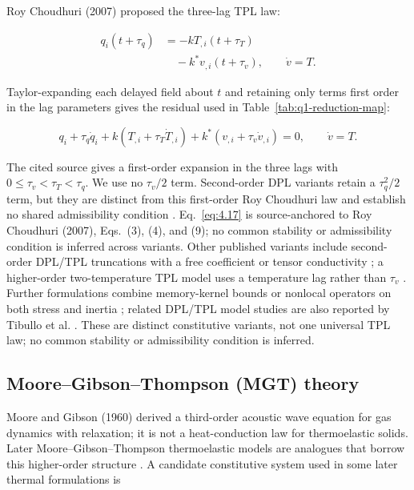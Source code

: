 Roy Choudhuri (2007) \cite{RoyChoudhuri2007} proposed the three-lag TPL law:

\begin{equation}
\begin{aligned}
q_i(t+\tau_q) &= -kT_{,i}(t+\tau_T)\\
&\quad - k^*v_{,i}(t+\tau_v), \qquad \dot v=T.
\end{aligned}
\label{eq:4.17}
\end{equation}

Taylor-expanding each delayed field about $t$ and retaining only terms first order in the lag parameters gives the residual used in Table~\ref{tab:q1-reduction-map}:

\begin{equation*}
q_i+\tau_q\dot q_i+k\left(T_{,i}+\tau_T\dot T_{,i}\right)
+k^*\left(v_{,i}+\tau_v\dot v_{,i}\right)=0,
\qquad \dot v=T.
\end{equation*}

The cited source gives a first-order expansion in the three lags with $0\leq\tau_v<\tau_T<\tau_q$. We use no $\tau_v/2$ term. Second-order DPL variants retain a $\tau_q^2/2$ term, but they are distinct from this first-order Roy Choudhuri law and establish no shared admissibility condition \cite{Yang2021,Gupta2023}. Eq.~\eqref{eq:4.17} is source-anchored to Roy Choudhuri (2007), Eqs.~(3), (4), and (9); no common stability or admissibility condition is inferred across variants. Other published variants include second-order DPL/TPL truncations with a free coefficient or tensor conductivity \cite{Kumar2023,Singh2019,Biswas2019}; a higher-order two-temperature TPL model uses a temperature lag rather than $\tau_v$ \cite{Abouelregal2020}. Further formulations combine memory-kernel bounds \cite{Singh2020a} or nonlocal operators on both stress and inertia \cite{Bayones2021}; related DPL/TPL model studies are also reported by Tibullo et al. \cite{Tibullo2017}. These are distinct constitutive variants, not one universal TPL law; no common stability or admissibility condition is inferred.

\subsection{Moore--Gibson--Thompson (MGT) theory}
\label{sec:4.9}

Moore and Gibson (1960) derived a third-order acoustic wave equation for gas dynamics with relaxation; it is not a heat-conduction law for thermoelastic solids. Later Moore--Gibson--Thompson thermoelastic models are analogues that borrow this higher-order structure \cite{MooreGibson1960,Quintanilla2019}. A candidate constitutive system used in some later thermal formulations is

